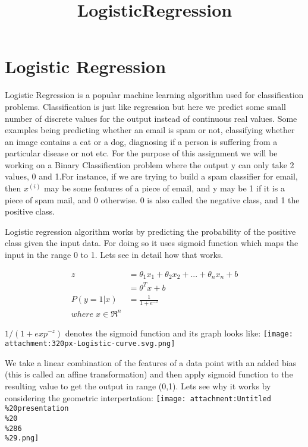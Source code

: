 \documentclass[11pt]{article}
\title{LogisticRegression}
\makeatletter
\def\maxwidth{\ifdim\Gin@nat@width>\linewidth\linewidth
    \else\Gin@nat@width\fi}
\let\Oldincludegraphics\includegraphics
\renewcommand{\includegraphics}[1]{\Oldincludegraphics[width=.8\maxwidth]{#1}}
\makeatother
\begin{document}
    
    
    \maketitle
    
    

    
    \section{Logistic Regression}\label{logistic-regression}

Logistic Regression is a popular machine learning algorithm used for
classification problems. Classification is just like regression but here
we predict some small number of discrete values for the output instead
of continuous real values. Some examples being predicting whether an
email is spam or not, classifying whether an image contains a cat or a
dog, diagnosing if a person is suffering from a particular disease or
not etc. For the purpose of this assignment we will be working on a
Binary Classification problem where the output y can only take 2 values,
0 and 1.For instance, if we are trying to build a spam classifier for
email, then \(x^{(i)}\) may be some features of a piece of email, and y
may be 1 if it is a piece of spam mail, and 0 otherwise. 0 is also
called the negative class, and 1 the positive class.

Logistic regression algorithm works by predicting the probability of the
positive class given the input data. For doing so it uses sigmoid
function which maps the input in the range 0 to 1. Lets see in detail
how that works.

\begin{align}
z &= \theta_{1}x_{1} + \theta_{2}x_{2} + ... + \theta_{n}x_{n} + b\\
  &= \theta^{T}x + b\\
P(y=1 | x) &= \frac{1}{1 + e^{-z}}\\
where\; x \in \Re^n
\end{align}

\(1/(1 + exp^{-z})\) denotes the sigmoid function and its graph looks
like: \texttt{[image: attachment:320px-Logistic-curve.svg.png]}

We take a linear combination of the features of a data point with an
added bias (this is called an affine transformation) and then apply
sigmoid function to the resulting value to get the output in range
(0,1). Lets see why it works by considering the geometric
interpertation:
\texttt{[image: attachment:Untitled\\\%20presentation\\\%20\\\%286\\\%29.png]}
\end{document}
